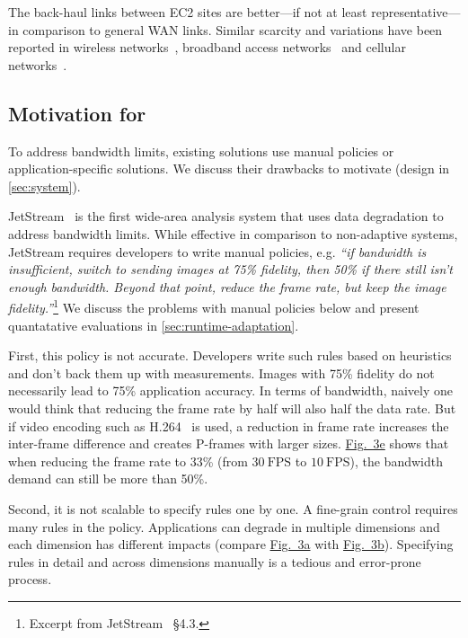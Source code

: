 The back-haul links between EC2 sites are better---if not at least
representative---in comparison to general WAN links. Similar scarcity and
variations have been reported in wireless networks~\cite{biswas2015large},
broadband access networks~\cite{grover2013peeking, sundaresan2014bismark} and
cellular networks~\cite{nikravesh2014mobile}.

\subsection{Motivation for \sysname{}}
\label{subsec:motivation}

To address bandwidth limits, existing solutions use manual policies or
application-specific solutions. We discuss their drawbacks to motivate
\sysname{} (design in \autoref{sec:system}).

 JetStream~\cite{rabkin2014aggregation} is
the first wide-area analysis system that uses data degradation to address
bandwidth limits. While effective in comparison to non-adaptive systems,
JetStream requires developers to write manual policies, e.g. \textit{``if
  bandwidth is insufficient, switch to sending images at 75\% fidelity, then
  50\% if there still isn't enough bandwidth. Beyond that point, reduce the
  frame rate, but keep the image fidelity.''}\footnote{Excerpt from
  JetStream~\cite{rabkin2014aggregation} \S 4.3.} We discuss the problems with
manual policies below and present quantatative evaluations in
\autoref{sec:runtime-adaptation}.

First, this policy is not accurate.  Developers write such rules based on
heuristics and don't back them up with measurements. Images with 75\% fidelity
do not necessarily lead to 75\% application accuracy. In terms of bandwidth,
naively one would think that reducing the frame rate by half will also half the
data rate. But if video encoding such as H.264~\cite{richardson2011h} is used, a
reduction in frame rate increases the inter-frame difference and creates
P-frames with larger sizes. \hyperref[fig:app-specific]{Fig.~3e} shows that when
reducing the frame rate to 33\% (from \(30~\text{FPS}\) to \(10~\text{FPS}\)),
the bandwidth demand can still be more than 50\%.

Second, it is not scalable to specify rules one by one. A fine-grain control
requires many rules in the policy. Applications can degrade in multiple
dimensions and each dimension has different impacts (compare
\hyperref[fig:app-specific]{Fig.~3a} with \hyperref[fig:app-specific]{Fig.~3b}).
Specifying rules in detail and across dimensions manually is a tedious and
error-prone process.

